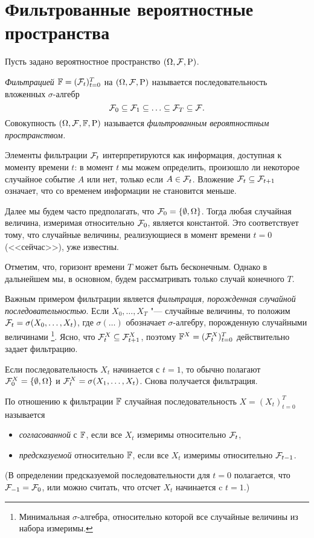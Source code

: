 \section{Фильтрованные вероятностные пространства}

Пусть задано вероятностное пространство $(\Omega,\mathcal{F},\mathrm{P})$.

\begin{definition}
\emph{Фильтрацией} $\mathbb{F}=(\mathcal{F}_t)_{t=0}^T$ на $(\Omega,\mathcal{F},\mathrm{P})$ называется последовательность вложенных $\sigma$-алгебр
\[
\mathcal{F}_0 \subseteq \mathcal{F}_1 \subseteq\ldots \subseteq \mathcal{F}_T \subseteq \mathcal{F}.
\]
Совокупность $(\Omega,\mathcal{F},\mathbb{F},\mathrm{P})$ называется \emph{фильтрованным вероятностным прос\-транством.}
\end{definition}

Элементы фильтрации $\mathcal{F}_t$ интерпретируются как информация, доступная к моменту времени $t$: в момент $t$ мы можем определить, произошло ли некоторое случайное событие $A$ или нет, только если $A\in \mathcal{F}_t$.
Вложение $\mathcal{F}_t\subseteq \mathcal{F}_{t+1}$ означает, что со временем информации не становится меньше.

\begin{remark}
Далее мы будем часто предполагать, что $\mathcal{F}_0=\{\emptyset,\Omega\}$.
Тогда любая случайная величина, измеримая относительно $\mathcal{F}_0$, является константой.
Это соответствует тому, что случайные величины, реализующиеся в момент времени $t=0$ (<<сейчас>>), уже известны.

Отметим, что, горизонт времени $T$ может быть бесконечным.
Однако в дальнейшем мы, в основном, будем рассматривать только случай конечного $T$.
\end{remark}

\begin{example}
Важным примером фильтрации является \emph{фильтрация, порожденная случайной последовательностью}.
Если $X_0,\dots,X_T$ "--- случайные величины, то положим $\mathcal{F}_t = \sigma(X_0,\dots,X_t)$, где $\sigma(\dots)$ обозначает $\sigma$-алгебру, порожденную случайными величинами%
\footnote{Минимальная $\sigma$-алгебра, относительно которой все случайные величины из набора измеримы.}.
Ясно, что $\mathcal{F}_t^X\subseteq \mathcal{F}_{t+1}^X$, поэтому $\mathbb{F}^X = (\mathcal{F}_t^X)_{t=0}^T$ действительно задает фильтрацию.

Если последовательность $X_t$ начинается с $t=1$, то обычно полагают $\mathcal{F}_0^X=\{\emptyset,\Omega\}$ и $\mathcal{F}_t^X = \sigma(X_1,\dots,X_t)$.
Снова получается фильтрация.
\end{example}

\begin{definition}
По отношению к фильтрации $\mathbb{F}$ случайная последовательность $X=(X_t)_{t=0}^T$ называется
\begin{itemize}
\item \emph{согласованной} с $\mathbb{F}$, если все $X_t$ измеримы относительно $\mathcal{F}_t$,
\item \emph{предсказуемой} относительно $\mathbb{F}$, если все $X_t$ измеримы относительно $\mathcal{F}_{t-1}$.
\end{itemize}
(В определении предсказуемой последовательности для $t=0$ полагается, что $\mathcal{F}_{-1}=\mathcal{F}_0$, или можно считать, что отсчет $X_t$ начинается c $t=1$.)
\end{definition}

